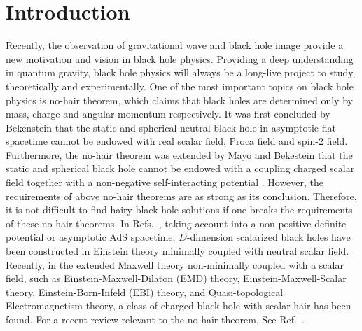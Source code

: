 \documentclass[pr, twocolumn, preprintnumbers, showpacs,footnoteadded, superscriptaddress,nofootinbib,longbibliography]{revtex4-1}
\begin{document}
\section{Introduction}\label{intro1}
Recently, the observation of gravitational wave and black hole image provide a new motivation and vision in black hole physics\cite{Abbott:2016blz,Akiyama:2019cqa}. Providing a deep understanding in quantum gravity, black hole physics will always be a long-live project to study, theoretically and experimentally. One of the most important topics on black hole physics is no-hair theorem, which claims that black holes are determined only by mass, charge and angular momentum respectively\cite{Ruffini:1971bza}. It was first concluded by Bekenstein that the static and spherical neutral black hole in asymptotic flat spacetime cannot be endowed with real scalar field, Proca field and spin-2 field\cite{Bekenstein:1972ny}. Furthermore, the no-hair theorem was extended by Mayo and Bekestein that the static and spherical black hole cannot be endowed with a coupling charged scalar field together with a non-negative self-interacting potential \cite{Mayo:1996mv}. However, the requirements of above no-hair theorems are as strong as its conclusion. Therefore, it is not difficult to find hairy black hole solutions if one breaks the requirements of these no-hair theorems. In Refs.~\cite{Feng:2013tza,Liu:2013gja,Fan:2015tua,Khodadi:2020jij}, taking account into a non positive definite potential or asymptotic AdS spacetime, $D$-dimension scalarized black holes have been constructed in Einstein theory minimally coupled with neutral scalar field. Recently, in the extended Maxwell theory non-minimally coupled with a scalar field, such as Einstein-Maxwell-Dilaton (EMD) theory\cite{Fan:2015oca}, Einstein-Maxwell-Scalar theory\cite{Konoplya:2019goy}, Einstein-Born-Infeld (EBI) theory\cite{Wang:2020ohb,Stefanov:2007eq}, and Quasi-topological Electromagnetism theory\cite{Myung:2020ctt}, a class of charged black hole with scalar hair has been found. For a recent review relevant to the no-hair theorem, See Ref.~\cite{Herdeiro:2015waa}.
\end{document}
